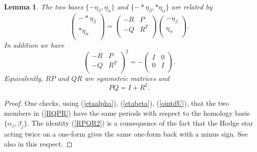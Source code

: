 \documentclass[reqno,12pt]{article}
\theoremstyle{plain}
\newtheorem{lemma}[thm]{Lemma}
\theoremstyle{definition}
\numberwithin{equation}{section}
\numberwithin{figure}{section}
\begin{document}
\begin{lemma}\label{lem:PQR}
The two bases $\{  -\eta_{\beta},  \eta_{\alpha}\}$ and $\{  -*\eta_{\beta},   *\eta_{\alpha}\}$ are related by 
\begin{equation}\label{RQPR} 
\left( \begin{array}{cc}
                                         -  *\eta_{\beta}  \\
                                            *\eta_{\alpha} \\
\end{array} \right)=
\left( \begin{array}{cc}
                                            -R & P  \\
                                              -Q & R^T \\
\end{array} \right)
\left( \begin{array}{cc}
                                           -   \eta_{\beta}  \\
                                              \eta_{\alpha} \\                                            
\end{array} \right).
\end{equation}
In addition we have
\begin{equation}\label{RPQR2}
\left( \begin{array}{cc}
                                            -R & P  \\
                                              -Q & R^T \\
\end{array} \right)^2
=-\left( \begin{array}{cc}
                                            I & 0  \\
                                              0 & I \\
\end{array} \right).
\end{equation}
Equivalently,  $RP$ and $QR$ are symmetric matrices and 
\begin{equation}\label{PQIR}
PQ=I+R^2.
\end{equation}
\end{lemma}

\begin{proof}
One checks, using (\ref{etaalpha}), (\ref{etabeta}), (\ref{ointdU}), 
that the two members in (\ref{RQPR}) have the same periods with respect to the homology basis  $\{\alpha_j, \beta_j\}$.
The identity (\ref{RPQR2}) is a consequence of the fact that the Hodge star acting twice on a one-form gives the same
one-form back with a minus sign. See also \cite{Farkas-Kra-1992} in this respect.
\end{proof}
\end{document}

